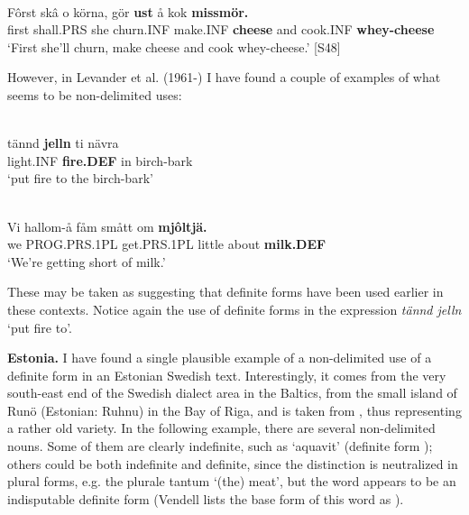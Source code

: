 \ea \label{} 
\\
\gll Fôrst  skâ  o  körna,  gör  \textbf{ust} å  kok  \textbf{missmör.} \\
first  shall.PRS  she  churn.INF  make.INF  \textbf{cheese} and  cook.INF  \textbf{whey-cheese} \\
\glt ‘First she’ll churn, make cheese and cook whey-cheese.’ [S48]

\z

However, in Levander et al. (1961-) I have found a couple of examples of what seems to be non-delimited uses:


\ea \label{} 
\\
\gll tännd  \textbf{jelln} ti  nävra\\
light.INF  \textbf{fire.DEF} in  birch-bark\\
\glt ‘put fire to the birch-bark’

\z

\ea \label{} 
\\
\gll Vi  hallom-å  fåm  smått  om  \textbf{mjôltjä.}\\
we  PROG.PRS.1PL  get.PRS.1PL  little  about  \textbf{milk.DEF}\\
\glt ‘We’re getting short of milk.’

\z

These may be taken as suggesting that definite forms have been used earlier in these contexts.  Notice again the use of definite forms in the expression \textit{tännd jelln} ‘put fire to’.


\textbf{Estonia.} I have found a single plausible example of a non-delimited use of a definite form in an Estonian Swedish text. Interestingly, it comes from the very south-east end of the Swedish dialect area in the Baltics, from the small island of Runö (Estonian: Ruhnu) in the Bay of Riga, and is taken from \citet{Vendell1882}, thus representing a rather old variety. In the following example, there are several non-delimited nouns. Some of them are clearly indefinite, such as  ‘aquavit’ (definite form ); others could be both indefinite and definite, since the distinction is neutralized in plural forms, e.g. the plurale tantum  ‘(the) meat’, but the word  appears to be an indisputable definite form (Vendell lists the base form of this word as ).

